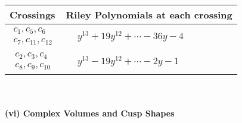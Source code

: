 \documentclass[1p]{elsarticle_modified}
\theoremstyle{definition}
\begin{document}
\begin{tabular}{m{50pt}|m{274pt}}
Crossings & \hspace{64pt}Riley Polynomials at each crossing \\
\hline $$\begin{aligned}c_{1},c_{5},c_{6}\\c_{7},c_{11},c_{12}\end{aligned}$$&$\begin{aligned}
&y^{13}+19 y^{12}+\cdots-36 y-4
\end{aligned}$\\
\hline $$\begin{aligned}c_{2},c_{3},c_{4}\\c_{8},c_{9},c_{10}\end{aligned}$$&$\begin{aligned}
&y^{13}-19 y^{12}+\cdots-2 y-1
\end{aligned}$\\
\hline
\end{tabular}\\~\\
\newpage\flushleft \textbf{(vi) Complex Volumes and Cusp Shapes}
\end{document}
